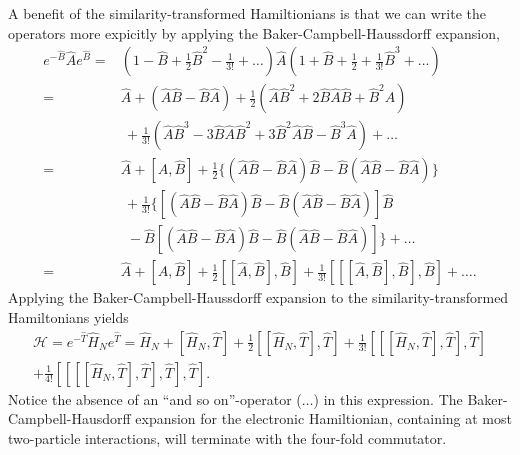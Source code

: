 A benefit of the similarity-transformed Hamiltionians is that we can write the operators
more expicitly by applying the Baker-Campbell-Haussdorff
expansion\cite{campbell1897law,baker1905alternants,hausdorff1906symbolische},
\begin{equation}
    \begin{aligned}
        e^{-\hat{B}}\hat{A}e^{\hat{B}}
        =& (1 - \hat{B} + \frac{1}{2}\hat{B}^2 - \frac{1}{3!} + \dots)
        \hat{A} (1 + \hat{B} + \frac{1}{2} + \frac{1}{3!}\hat{B}^3 + \dots) \\
        =& \hat{A} + (\hat{A}\hat{B} - \hat{B}\hat{A}) 
        + \frac{1}{2}(\hat{A}\hat{B}^2 + 2\hat{B}\hat{A}\hat{B} + \hat{B}^2\hat{A})
        \\ &\ + \frac{1}{3!}(
            \hat{A}\hat{B}^3 - 3\hat{B}\hat{A}\hat{B}^2 + 3\hat{B}^2\hat{A}\hat{B}
            - \hat{B}^3\hat{A}
        ) + \dots \\
        =& \hat{A} + [\hat{A}, \hat{B}] + 
        \frac{1}{2}\{
            (\hat{A}\hat{B} - \hat{B}\hat{A})\hat{B}
            -\hat{B}(\hat{A}\hat{B} - \hat{B}\hat{A})     
        \} \\ &\ + \frac{1}{3!} \{
            [(\hat{A}\hat{B} - \hat{B}\hat{A})\hat{B}
            -\hat{B}(\hat{A}\hat{B} - \hat{B}\hat{A})] \hat{B}\\
            &\ \ -\hat{B}[(\hat{A}\hat{B} - \hat{B}\hat{A})\hat{B}
            -\hat{B}(\hat{A}\hat{B} - \hat{B}\hat{A})]
        \} + \dots \\
        =& \hat{A} + [\hat{A}, \hat{B}]
        + \frac{1}{2}[[\hat{A}, \hat{B}], \hat{B}]
        + \frac{1}{3!} [[[\hat{A}, \hat{B}], \hat{B}], \hat{B}] + \dots .
    \end{aligned}
\end{equation}
Applying the Baker-Campbell-Haussdorff expansion to the similarity-transformed 
Hamiltonians yields
\begin{equation}
    \begin{gathered}
    \label{eq:bch_hamiltonian}
    \mathscr{H} = 
    e^{-\hat{T}}\hat{H}_Ne^{\hat{T}} = \hat{H}_N + [\hat{H}_N, \hat{T}]
        + \frac{1}{2}[[\hat{H}_N, \hat{T}], \hat{T}]
        + \frac{1}{3!}[[[\hat{H}_N, \hat{T}], \hat{T}], \hat{T}] \\
        + \frac{1}{4!}[[[[\hat{H}_N, \hat{T}], \hat{T}], \hat{T}], \hat{T}].
    \end{gathered}
\end{equation}
Notice the absence of an ``and so on''-operator ($\dots$) in this expression. The Baker-Campbell-Hausdorff expansion 
for the electronic Hamiltionian, containing at most two-particle interactions, will 
terminate with the four-fold commutator.

